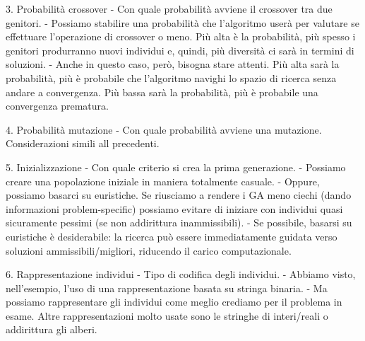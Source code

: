 \documentclass{article}
\begin{document}
    3. Probabilità crossover - Con quale probabilità avviene il crossover tra due genitori.
    - Possiamo stabilire una probabilità che l’algoritmo userà per valutare se effettuare l’operazione di crossover o meno. Più alta è la probabilità, più spesso i
    genitori produrranno nuovi individui e, quindi, più diversità ci sarà in termini di soluzioni.
    - Anche in questo caso, però, bisogna stare attenti. Più alta sarà la probabilità, più è probabile che l’algoritmo navighi lo spazio di ricerca senza andare a
    convergenza. Più bassa sarà la probabilità, più è probabile una convergenza prematura.

    4. Probabilità mutazione - Con quale probabilità avviene una mutazione.
    Considerazioni simili all precedenti.

    5. Inizializzazione - Con quale criterio si crea la prima generazione.
    - Possiamo creare una popolazione iniziale in maniera totalmente casuale.
    - Oppure, possiamo basarci su euristiche. Se riusciamo a rendere i GA meno ciechi (dando informazioni problem-specific) possiamo evitare di iniziare con individui
    quasi sicuramente pessimi (se non addirittura inammissibili).
    - Se possibile, basarsi su euristiche è desiderabile: la ricerca può essere immediatamente guidata verso soluzioni ammissibili/migliori, riducendo il carico
    computazionale.

    6. Rappresentazione individui - Tipo di codifica degli individui.
    - Abbiamo visto, nell’esempio, l’uso di una rappresentazione basata su stringa binaria.
    - Ma possiamo rappresentare gli individui come meglio crediamo per il problema in esame.
    Altre rappresentazioni molto usate sono le stringhe di interi/reali o addirittura gli alberi.
\end{document}

